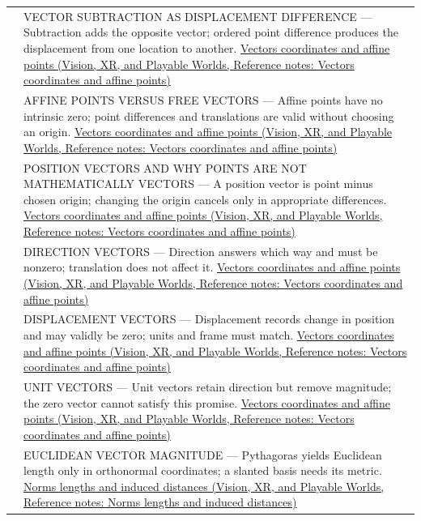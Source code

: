 {\begin{longtable}[]{@{}
  >{\raggedright\arraybackslash}p{}
  >{\raggedright\arraybackslash}p{}@{}}
520 & VECTOR SUBTRACTION AS DISPLACEMENT DIFFERENCE --- Subtraction adds the opposite vector; ordered point difference produces the displacement from one location to another. \href{../07-Vision-XR-and-Playable-Worlds/main.pdf\#nameddest=appendix-0659864c0aa3}{Vectors coordinates and affine points (Vision, XR, and Playable Worlds, Reference notes: Vectors coordinates and affine points)} \\
521 & AFFINE POINTS VERSUS FREE VECTORS --- Affine points have no intrinsic zero; point differences and translations are valid without choosing an origin. \href{../07-Vision-XR-and-Playable-Worlds/main.pdf\#nameddest=appendix-0659864c0aa3}{Vectors coordinates and affine points (Vision, XR, and Playable Worlds, Reference notes: Vectors coordinates and affine points)} \\
522 & POSITION VECTORS AND WHY POINTS ARE NOT MATHEMATICALLY VECTORS --- A position vector is point minus chosen origin; changing the origin cancels only in appropriate differences. \href{../07-Vision-XR-and-Playable-Worlds/main.pdf\#nameddest=appendix-0659864c0aa3}{Vectors coordinates and affine points (Vision, XR, and Playable Worlds, Reference notes: Vectors coordinates and affine points)} \\
523 & DIRECTION VECTORS --- Direction answers which way and must be nonzero; translation does not affect it. \href{../07-Vision-XR-and-Playable-Worlds/main.pdf\#nameddest=appendix-0659864c0aa3}{Vectors coordinates and affine points (Vision, XR, and Playable Worlds, Reference notes: Vectors coordinates and affine points)} \\
524 & DISPLACEMENT VECTORS --- Displacement records change in position and may validly be zero; units and frame must match. \href{../07-Vision-XR-and-Playable-Worlds/main.pdf\#nameddest=appendix-0659864c0aa3}{Vectors coordinates and affine points (Vision, XR, and Playable Worlds, Reference notes: Vectors coordinates and affine points)} \\
525 & UNIT VECTORS --- Unit vectors retain direction but remove magnitude; the zero vector cannot satisfy this promise. \href{../07-Vision-XR-and-Playable-Worlds/main.pdf\#nameddest=appendix-0659864c0aa3}{Vectors coordinates and affine points (Vision, XR, and Playable Worlds, Reference notes: Vectors coordinates and affine points)} \\
526 & EUCLIDEAN VECTOR MAGNITUDE --- Pythagoras yields Euclidean length only in orthonormal coordinates; a slanted basis needs its metric. \href{../07-Vision-XR-and-Playable-Worlds/main.pdf\#nameddest=appendix-49933872bb51}{Norms lengths and induced distances (Vision, XR, and Playable Worlds, Reference notes: Norms lengths and induced distances)} \\

\end{longtable}}
